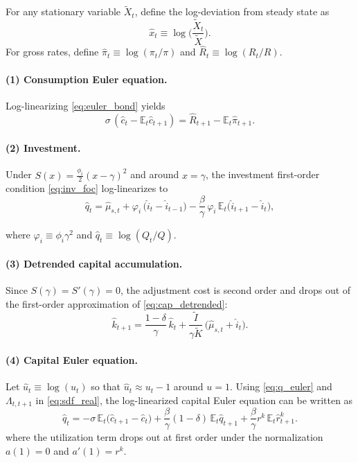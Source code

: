 For any stationary variable $\tilde X_t$, define the log-deviation from steady state as
\begin{equation}
	\hat x_t \equiv \log\Big(\frac{\tilde X_t}{\tilde X}\Big).
\end{equation}
For gross rates, define $\hat\pi_t\equiv\log(\pi_t/\pi)$ and $\hat R_t\equiv\log(R_t/R)$.

\paragraph{(1) Consumption Euler equation.}
Log-linearizing \eqref{eq:euler_bond} yields
\begin{equation}
	\sigma\,(\hat c_t-\mathbb{E}_t\hat c_{t+1}) = \hat R_{t+1} - \mathbb{E}_t\hat\pi_{t+1}.
	\label{eq:loglin_euler_c}
\end{equation}

\paragraph{(2) Investment.}
Under $S(x)=\frac{\phi_i}{2}(x-\gamma)^2$ and around $x=\gamma$, the investment first-order condition \eqref{eq:inv_foc} log-linearizes to
\begin{equation}
	\hat q_t = \hat\mu_{s,t}
	+ \varphi_i\,\big(\hat i_t-\hat i_{t-1}\big)
	- \frac{\beta}{\gamma}\,\varphi_i\,\mathbb{E}_t\big(\hat i_{t+1}-\hat i_t\big),
	\label{eq:loglin_inv}
\end{equation}

where $\varphi_i\equiv \phi_i\gamma^2$ and $\hat q_t\equiv\log(Q_t/Q)$.

\paragraph{(3) Detrended capital accumulation.}
Since $S(\gamma)=S'(\gamma)=0$, the adjustment cost is second order and drops out of the first-order approximation of \eqref{eq:cap_detrended}:
\begin{equation}
	\hat k_{t+1} = \frac{1-\delta}{\gamma}\,\hat k_t + \frac{\tilde I}{\gamma\tilde K}\,\big(\hat\mu_{s,t}+\hat i_t\big).
	\label{eq:loglin_k}
\end{equation}

\paragraph{(4) Capital Euler equation.}
Let $\hat u_t\equiv\log(u_t)$ so that $\hat u_t\approx u_t-1$ around $u=1$.
Using \eqref{eq:q_euler} and $\Lambda_{t,t+1}$ in \eqref{eq:sdf_real}, the log-linearized capital Euler equation can be written as
\begin{equation}
	\hat q_t = -\sigma\,\mathbb{E}_t\big(\hat c_{t+1}-\hat c_t\big)
	+ \frac{\beta}{\gamma}(1-\delta)\,\mathbb{E}_t\hat q_{t+1}
	+ \frac{\beta}{\gamma}r^k\,\mathbb{E}_t\hat r^k_{t+1}.
	\label{eq:loglin_q}
\end{equation}
where the utilization term drops out at first order under the normalization $a(1)=0$ and $a'(1)=r^k$.

